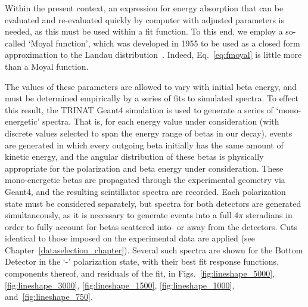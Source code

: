 Within the present context, an expression for energy absorption that can be evaluated and re-evaluated quickly by computer with adjusted parameters is needed, as this must be used within a fit function.  To this end, we employ a so-called `Moyal function', which was developed in 1955 to be used as a closed form approximation to the Landau distribution~\cite{moyal}.  Indeed, Eq.~\ref{eq:fmoyal} is little more than a Moyal function.  

The values of these parameters are allowed to vary with initial beta energy, and must be determined empirically by a series of fits to simulated spectra.  
To effect this result, the TRINAT Geant4 simulation is used to generate a series of `mono-energetic' spectra.  That is, for each energy value under consideration (with discrete values selected to span the energy range of betas in our decay), events are generated in which every outgoing beta initially has the same amount of kinetic energy, and the angular distribution of these betas is physically appropriate for the polarization and beta energy under consideration.  These mono-energetic betas are propagated through the experimental geometry via Geant4, and the resulting scintillator spectra are recorded.  Each polarization state must be considered separately, but spectra for both detectors are generated simultaneously, as it is necessary to generate events into a full $4\pi$ steradians in order to fully account for betas scattered into- or away from the detectors.  Cuts identical to those imposed on the experimental data are applied (see Chapter~\ref{dataselection_chapter}).  Several such spectra are shown for the Bottom Detector in the `-' polarization state, with their best fit response functions, components thereof, and residuals of the fit, in Figs.~\ref{fig:lineshape_5000}, \ref{fig:lineshape_3000}, \ref{fig:lineshape_1500}, \ref{fig:lineshape_1000}, and~\ref{fig:lineshape_750}.

